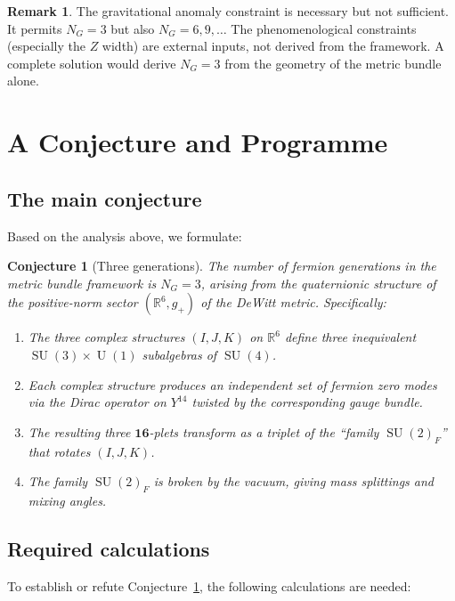 \documentclass[12pt,a4paper]{article}
\newtheorem{conjecture}[theorem]{Conjecture}
\theoremstyle{definition}
\newtheorem{remark}[theorem]{Remark}
\newcommand{\SU}{\operatorname{SU}}
\newcommand{\U}{\operatorname{U}}
\newcommand{\R}{\mathbb{R}}
\begin{document}
\begin{remark}
The gravitational anomaly constraint is necessary but not sufficient.
It permits $N_G = 3$ but also $N_G = 6, 9, \ldots$
The phenomenological constraints (especially the $Z$ width) are external inputs, not derived from the framework.
A complete solution would derive $N_G = 3$ from the geometry of the metric bundle alone.
\end{remark}


\section{A Conjecture and Programme}
\label{sec:conjecture}

\subsection{The main conjecture}

Based on the analysis above, we formulate:

\begin{conjecture}[Three generations]
\label{conj:main}
The number of fermion generations in the metric bundle framework is $N_G = 3$, arising from the quaternionic structure of the positive-norm sector $(\R^6, g_+)$ of the DeWitt metric.
Specifically:
\begin{enumerate}
\item The three complex structures $(I, J, K)$ on $\R^6$ define three inequivalent $\SU(3) \times \U(1)$ subalgebras of $\SU(4)$.
\item Each complex structure produces an independent set of fermion zero modes via the Dirac operator on $Y^{14}$ twisted by the corresponding gauge bundle.
\item The resulting three $\mathbf{16}$-plets transform as a triplet of the ``family $\SU(2)_F$'' that rotates $(I, J, K)$.
\item The family $\SU(2)_F$ is broken by the vacuum, giving mass splittings and mixing angles.
\end{enumerate}
\end{conjecture}

\subsection{Required calculations}

To establish or refute Conjecture~\ref{conj:main}, the following calculations are needed:
\end{document}
